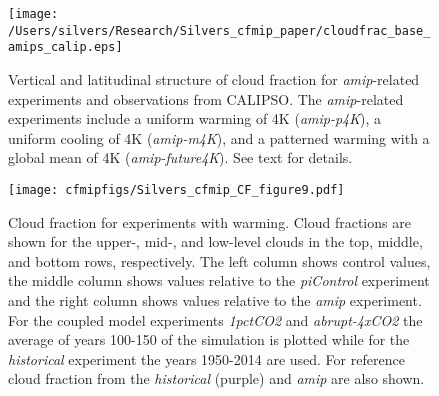 \documentclass[draft]{agujournal2019}
\begin{document}
 
\begin{figure}
  \centering
  \texttt{[image: /Users/silvers/Research/Silvers\_cfmip\_paper/cloudfrac\_base\_amips\_calip.eps]}
  \caption{Vertical and latitudinal structure of cloud fraction for \textit{amip}-related experiments and observations from 
  CALIPSO.  The \textit{amip}-related experiments include a uniform warming of 4K (\textit{amip-p4K}), 
  a uniform cooling of 4K (\textit{amip-m4K}), and a 
  patterned warming with a global mean of 4K (\textit{amip-future4K}).  See text for details.}
  \label{fig:calipso_amip_comparison}
\end{figure}



\begin{figure}
  \centering
  \texttt{[image: cfmipfigs/Silvers\_cfmip\_CF\_figure9.pdf]}
  \caption{Cloud fraction for experiments with warming.  Cloud fractions are shown for the upper-, mid-, and low-level 
  clouds in the top, middle, and bottom rows, respectively.  The left column shows control values, the middle column
  shows values relative to the \textit{piControl} experiment and the right column
  shows values relative to the \textit{amip} experiment.  For the coupled model experiments
 \textit{1pctCO2} and \textit{abrupt-4xCO2} the average of years 100-150 of the simulation is plotted while for the 
 \textit{historical} experiment the years 1950-2014 are used.  
  For reference cloud fraction from the 
 \textit{historical} (purple) and \textit{amip} are also shown.}
  \label{fig:CF_warming}
\end{figure}
\end{document}
